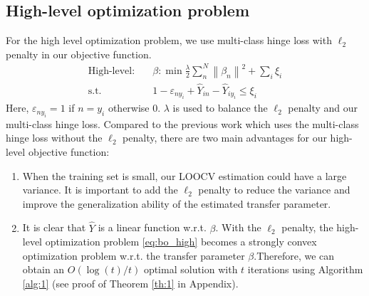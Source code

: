 \subsection{High-level optimization problem} 
For the high level optimization problem, we use multi-class hinge loss \cite{crammer2002algorithmic} with $\ell_2$ penalty in our objective function.
\begin{equation}\label{eq:bo_high}
\begin{aligned}
\text{High-level:}\quad&\beta: \min \frac{{{\lambda}}}{2}\sum\limits_{n}^N {{{\left\| {{\beta _n}} \right\|}^2}}  +
\sum_i\xi_i\\
\text{s.t.} \qquad& 1 - {\varepsilon _{n{y_i}}} + {\hat Y_{in}} - {\hat Y_{i{y_i}}} \le {\xi_i}
\end{aligned}
\end{equation}
Here, $\varepsilon _{n{y_i}}=1$ if $n=y_i$ otherwise 0.
$\lambda$ is used to balance the $\ell_2$ penalty and our multi-class hinge loss. 
Compared to the previous work \cite{kuzborskij2013n,tommasi2014learning} which uses the multi-class hinge loss without the $\ell_2$ penalty, there are two main advantages for our high-level objective function: 
\begin{enumerate}
	\item When the training set is small, our LOOCV estimation could have a large variance. It is important to add the $\ell_2$ penalty to {reduce the variance and improve the generalization ability of the estimated transfer parameter}.
	\item It is clear that $\hat{Y}$ is a linear function w.r.t. $\beta$. With the $\ell_2$ penalty, the high-level optimization problem \eqref{eq:bo_high} becomes a strongly convex optimization problem w.r.t. the transfer parameter $\beta$.Therefore, we can obtain an $O({\log(t)}/{t})$ optimal solution with $t$ iterations using Algorithm \ref{alg:1} (see proof of Theorem \ref{th:1} in Appendix).
\end{enumerate}

 